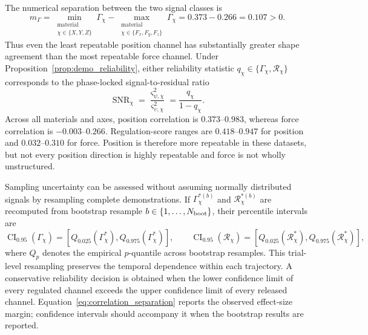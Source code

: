 \documentclass[11pt,a4paper]{article}
\begin{document}
The numerical separation between the two signal classes is
\begin{equation}
m_\Gamma
=\min_{\substack{\mathrm{material}\\\chi\in\{X,Y,Z\}}}\Gamma_\chi
-\max_{\substack{\mathrm{material}\\\chi\in\{F_x,F_y,F_z\}}}\Gamma_\chi
=0.373-0.266=0.107>0 .
\label{eq:correlation_separation}
\end{equation}
Thus even the least repeatable position channel has substantially greater shape
agreement than the most repeatable force channel. Under
Proposition~\ref{prop:demo_reliability}, either reliability statistic
$q_\chi\in\{\Gamma_\chi,\mathcal R_\chi\}$ corresponds to the
phase-locked signal-to-residual ratio
\begin{equation}
\operatorname{SNR}_\chi
=\frac{\varsigma_{\psi,\chi}^2}{\varsigma_{\upsilon,\chi}^2}
=\frac{q_\chi}{1-q_\chi}.
\label{eq:repeatability_snr}
\end{equation}
Across all materials and axes, position correlation is $0.373$--$0.983$,
whereas force correlation is $-0.003$--$0.266$. Regulation-score ranges are
$0.418$--$0.947$ for position and $0.032$--$0.310$ for force. Position is
therefore more repeatable in these datasets, but not every position direction
is highly repeatable and force is not wholly unstructured.

Sampling uncertainty can be assessed without assuming normally distributed
signals by resampling complete demonstrations. If
$\Gamma_\chi^{*(b)}$ and $\mathcal R_\chi^{*(b)}$ are recomputed from bootstrap
resample $b\in\{1,\ldots,N_{\rm boot}\}$, their percentile intervals are
\begin{equation}
\operatorname{CI}_{0.95}(\Gamma_\chi)
=\left[
Q_{0.025}\!\left(\Gamma_\chi^*\right),
Q_{0.975}\!\left(\Gamma_\chi^*\right)
\right],
\qquad
\operatorname{CI}_{0.95}(\mathcal R_\chi)
=\left[
Q_{0.025}\!\left(\mathcal R_\chi^*\right),
Q_{0.975}\!\left(\mathcal R_\chi^*\right)
\right],
\label{eq:reliability_bootstrap}
\end{equation}
where $Q_p$ denotes the empirical $p$-quantile across bootstrap resamples.
This trial-level resampling preserves the temporal dependence within each
trajectory. A conservative reliability decision is obtained when the lower
confidence limit of every regulated channel exceeds the upper confidence limit
of every released channel. Equation~\eqref{eq:correlation_separation} reports
the observed effect-size margin; confidence intervals should accompany it when
the bootstrap results are reported.
\end{document}

